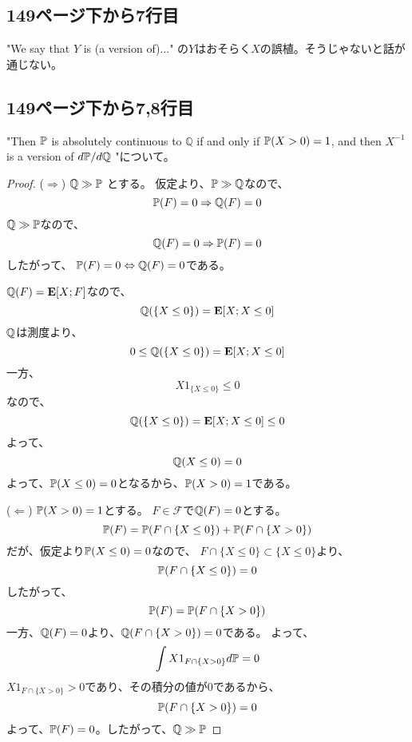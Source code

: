   \subsection{149ページ下から7行目}
    "We say that $Y$ is (a version of)..." の$Y$はおそらく$X$の誤植。そうじゃないと話が通じない。
  \subsection{149ページ下から7,8行目}
    "Then ${\mathbb{P}}$ is absolutely continuous to $\mathbb{Q}$ if and only if ${\mathbb{P}}(X>0) = 1$,
    and then $X^{-1}$ is a version of $d{\mathbb{P}}/d\mathbb{Q}$ "について。

    \begin{proof}
      ($\Rightarrow$) ${\mathbb{Q}} \gg {\mathbb{P}}$ とする。
      仮定より、${\mathbb{P}} \gg {\mathbb{Q}}$なので、
      \[
        {\mathbb{P}}(F) = 0 \Rightarrow {\mathbb{Q}}(F) = 0
      \]
      ${\mathbb{Q}} \gg {\mathbb{P}}$なので、
      \[
        {\mathbb{Q}}(F) = 0 \Rightarrow {\mathbb{P}}(F) = 0
      \]
      したがって、
      ${\mathbb{P}}(F) = 0 \Leftrightarrow {\mathbb{Q}}(F) = 0$である。

      ${\mathbb{Q}}(F) = {\mathbf{E}}[X; F]$なので、
      \[
        {\mathbb{Q}}(\{X \leq 0\}) = {\mathbf{E}}[X; X \leq 0]
      \]
      ${\mathbb{Q}}$は測度より、
      \[
        0 \leq {\mathbb{Q}}(\{X \leq 0\}) = {\mathbf{E}}[X; X \leq 0]
      \]
      一方、
      \[
        X1_{\{X \leq 0\}} \leq 0
      \]
      なので、
      \[
        {\mathbb{Q}}(\{X \leq 0\}) = {\mathbf{E}}[X; X \leq 0] \leq 0
      \]
      よって、
      \[
        {\mathbb{Q}}(X \leq 0) = 0
      \]
      よって、${\mathbb{P}}(X \leq 0) = 0$となるから、${\mathbb{P}}(X > 0) = 1$である。

      ($\Leftarrow$) ${\mathbb{P}}(X>0) = 1$とする。
      $F \in \mathcal{F}$で${\mathbb{Q}}(F) = 0$とする。
      \[
        {\mathbb{P}}(F) = {\mathbb{P}}(F \cap \{X \leq 0\}) + {\mathbb{P}}(F \cap \{X>0\})
      \]
      だが、仮定より${\mathbb{P}}(X \leq 0) = 0$なので、
      $F \cap \{X \leq 0 \} \subset \{X \leq 0\}$より、
      \[
        {\mathbb{P}}(F \cap \{X \leq 0\}) = 0
      \]
      したがって、
      \[
        {\mathbb{P}}(F) = {\mathbb{P}}(F \cap \{X > 0\})
      \]
      一方、${\mathbb{Q}}(F) = 0$より、${\mathbb{Q}}(F \cap \{X > 0\}) = 0$である。
      よって、
      \[
        \int X1_{F \cap \{X > 0\}} d{\mathbb{P}} = 0
      \]
      $X1_{F \cap \{X > 0\}} > 0$であり、その積分の値が$0$であるから、
      \[
        {\mathbb{P}}(F \cap \{X > 0\}) = 0
      \]
      よって、${\mathbb{P}}(F) = 0$。したがって、${\mathbb{Q}} \gg {\mathbb{P}}$


\end{proof}
